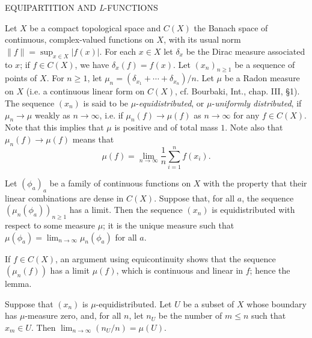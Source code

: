 
%
  {EQUIPARTITION AND \textit{L}-FUNCTIONS}


Let $X$ be a compact topological space and $C(X)$ the Banach space of continuous, complex-valued functions on $X$, with its usual norm $\|f\| = \sup_{x \in X} |f(x)|$. For each $x \in X$ let $\delta_x$ be the Dirac measure associated to $x$; if $f \in C(X)$, we have $\delta_x(f) = f(x)$. Let $(x_n)_{n \geq 1}$ be a sequence of points of $X$. For $n \geq 1$, let $\mu_n = (\delta_{x_1} + \cdots + \delta_{x_n})/n$. Let $\mu$ be a Radon measure on $X$ (i.e. a continuous linear form on $C(X)$, cf. Bourbaki, Int., chap. III, \S 1). The sequence $(x_n)$ is said to be $\mu$-\emph{equidistributed}, or $\mu$-\emph{uniformly distributed}, if $\mu_n \longrightarrow \mu$ weakly as $n \to \infty$, i.e. if $\mu_n(f) \longrightarrow \mu(f)$ as $n \to \infty$ for any $f \in C(X)$. Note that this implies that $\mu$ is positive and of total mass $1$. Note also that $\mu_n(f) \longrightarrow \mu(f)$ means that
\[
\mu(f) = \lim_{n \to \infty} \frac{1}{n} \sum_{i=1}^{n} f(x_i).
\]

\begin{lemma}[1]\label{lem:I.A.1.1}
Let $(\phi_a)_a$ be a family of continuous functions on $X$ with the property that their linear combinations are dense in $C(X)$. Suppose that, for all $a$, the sequence $(\mu_n(\phi_a))_{n \geq 1}$ has a limit. Then the sequence $(x_n)$ is equidistributed with respect to some measure $\mu$; it is the unique measure such that $\mu(\phi_a) = \lim_{n \to \infty} \mu_n(\phi_a)$ for all $a$.

If $f \in C(X)$, an argument using equicontinuity shows that the sequence $(\mu_n(f))$ has a limit $\mu(f)$, which is continuous and linear in $f$; hence the lemma.
\end{lemma}

\begin{proposition}[1]\label{prop:I.A.1.1}
Suppose that $(x_n)$ is $\mu$-equidistributed. Let $U$ be a subset of $X$ whose boundary has $\mu$-measure zero, and, for all $n$, let $n_U$ be the number of $m \leq n$ such that $x_m \in U$. Then $\lim_{n \to \infty} (n_U/n) = \mu(U)$.
\end{proposition}


